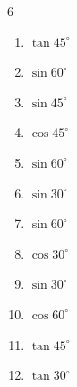 \begin{multicols}{6}
\begin{enumerate}

  \item $\displaystyle \tan{45^\circ}$

        \phantom{$\displaystyle =1$}

  \item $\displaystyle \sin{60^\circ}$


  \item $\displaystyle \sin{45^\circ}$


  \item $\displaystyle \cos{45^\circ}$


  \item $\displaystyle \sin{60^\circ}$


  \item $\displaystyle \sin{30^\circ}$


\columnbreak %

  \item $\displaystyle \sin{60^\circ}$


  \item $\displaystyle \cos{30^\circ}$


  \item $\displaystyle \sin{30^\circ}$


  \item $\displaystyle \cos{60^\circ}$


  \item $\displaystyle \tan{45^\circ}$

        \phantom{$\displaystyle =1$}

  \item $\displaystyle \tan{30^\circ}$



\end{enumerate}
\end{multicols}
